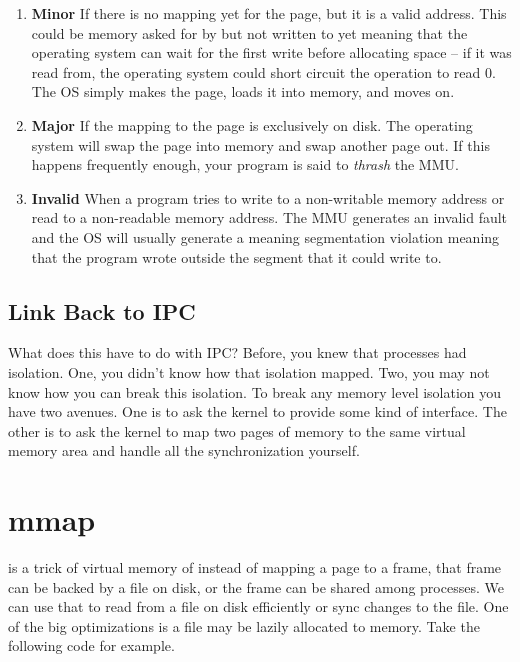 \begin{enumerate}
	\item \textbf{Minor} If there is no mapping yet for the page, but it is a valid address.
	      This could be memory asked for by  but not written to yet meaning that the operating system can wait for the first write before allocating space -- if it was read from, the operating system could short circuit the operation to read 0.
	      The OS simply makes the page, loads it into memory, and moves on.
	      	 
	\item \textbf{Major} If the mapping to the page is exclusively on disk.
	      The operating system will swap the page into memory and swap another page out.
	      If this happens frequently enough, your program is said to \emph{thrash} the MMU.
	      	 
	\item \textbf{Invalid} When a program tries to write to a non-writable memory address or read to a non-readable memory address.
	      The MMU generates an invalid fault and the OS will usually generate a  meaning segmentation violation meaning that the program wrote outside the segment that it could write to.
	      	 
\end{enumerate}
	 
\subsection{Link Back to IPC}
	 
What does this have to do with IPC?
Before, you knew that processes had isolation.
One, you didn't know how that isolation mapped.
Two, you may not know how you can break this isolation.
To break any memory level isolation you have two avenues.
One is to ask the kernel to provide some kind of interface.
The other is to ask the kernel to map two pages of memory to the same virtual memory area and handle all the synchronization yourself.
	 
\section{mmap}
	 
 is a trick of virtual memory of instead of mapping a page to a frame, that frame can be backed by a file on disk, or the frame can be shared among processes.
We can use that to read from a file on disk efficiently or sync changes to the file.
One of the big optimizations is a file may be lazily allocated to memory.
Take the following code for example.
	 
